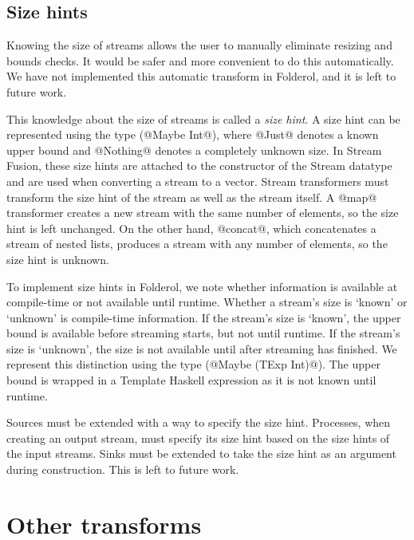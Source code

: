 \subsection{Size hints}
\label{s:implementation:sizehints}

Knowing the size of streams allows the user to manually eliminate resizing and bounds checks.
It would be safer and more convenient to do this automatically.
We have not implemented this automatic transform in Folderol, and it is left to future work.

This knowledge about the size of streams is called a \emph{size hint}.
A size hint can be represented using the type (@Maybe Int@), where @Just@ denotes a known upper bound and @Nothing@ denotes a completely unknown size.
In Stream Fusion, these size hints are attached to the constructor of the Stream datatype \cite{coutts2007rewriting} and are used when converting a stream to a vector.
Stream transformers must transform the size hint of the stream as well as the stream itself.
A @map@ transformer creates a new stream with the same number of elements, so the size hint is left unchanged.
On the other hand, @concat@, which concatenates a stream of nested lists, produces a stream with any number of elements, so the size hint is unknown.

To implement size hints in Folderol, we note whether information is available at compile-time or not available until runtime.
Whether a stream's size is `known' or `unknown' is compile-time information.
If the stream's size is `known', the upper bound is available before streaming starts, but not until runtime.
If the stream's size is `unknown', the size is not available until after streaming has finished.
We represent this distinction using the type (@Maybe (TExp Int)@).
The upper bound is wrapped in a Template Haskell expression as it is not known until runtime.

Sources must be extended with a way to specify the size hint.
Processes, when creating an output stream, must specify its size hint based on the size hints of the input streams.
Sinks must be extended to take the size hint as an argument during construction.
This is left to future work.

\section{Other transforms}

